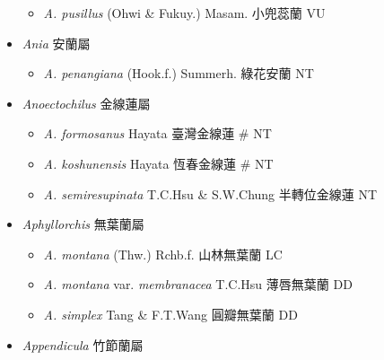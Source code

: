 \begin{itemize}
  \begin{itemize}
        \item[] \textit{A. pusillus} (Ohwi \& Fukuy.) Masam.  小兜蕊蘭   VU
  \end{itemize}
 \item[] \textit{Ania} 安蘭屬
                                
  \begin{itemize}
        \item[] \textit{A. penangiana} (Hook.f.) Summerh.  綠花安蘭   NT
  \end{itemize}
 \item[] \textit{Anoectochilus} 金線蓮屬
                                
  \begin{itemize}
        \item[] \textit{A. formosanus} Hayata  臺灣金線蓮  \# NT
        \item[] \textit{A. koshunensis} Hayata  恆春金線蓮  \# NT
        \item[] \textit{A. semiresupinata} T.C.Hsu \& S.W.Chung  半轉位金線蓮   NT
  \end{itemize}
 \item[] \textit{Aphyllorchis} 無葉蘭屬
                                
  \begin{itemize}
        \item[] \textit{A. montana} (Thw.) Rchb.f.  山林無葉蘭   LC
        \item[] \textit{A. montana} var. \textit{membranacea} T.C.Hsu  薄唇無葉蘭   DD
        \item[] \textit{A. simplex} Tang \& F.T.Wang  圓瓣無葉蘭   DD
  \end{itemize}
 \item[] \textit{Appendicula} 竹節蘭屬
                                

\end{itemize}
